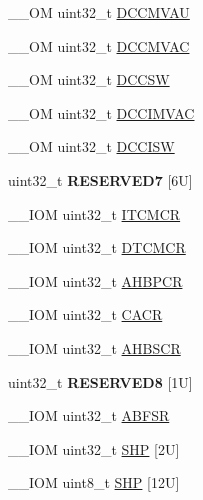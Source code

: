 \begin{DoxyCompactItemize}
\+\_\+\+\_\+\+OM uint32\+\_\+t \hyperlink{struct_s_c_b___type_aae3caeea159ab54859ea11397f942cfa}{D\+C\+C\+M\+V\+AU}
\item 
\+\_\+\+\_\+\+OM uint32\+\_\+t \hyperlink{struct_s_c_b___type_a042e3622c98de4e908cfda4f70d1f097}{D\+C\+C\+M\+V\+AC}
\item 
\+\_\+\+\_\+\+OM uint32\+\_\+t \hyperlink{struct_s_c_b___type_ab95cc818be9fa7d25ae516f3fe6b7788}{D\+C\+C\+SW}
\item 
\+\_\+\+\_\+\+OM uint32\+\_\+t \hyperlink{struct_s_c_b___type_a4f59813582b53feb5f1afbbad3db2022}{D\+C\+C\+I\+M\+V\+AC}
\item 
\+\_\+\+\_\+\+OM uint32\+\_\+t \hyperlink{struct_s_c_b___type_af50f7a0a9574fe0e24a68bb4eca75140}{D\+C\+C\+I\+SW}
\item 
\mbox{\label{struct_s_c_b___type_a5a892b5bc17fba63dad48a2352c26024}} 
uint32\+\_\+t {\bfseries R\+E\+S\+E\+R\+V\+E\+D7} \mbox{[}6\+U\mbox{]}
\item 
\+\_\+\+\_\+\+I\+OM uint32\+\_\+t \hyperlink{struct_s_c_b___type_aba8abbd3db06a07b50f56547501983f9}{I\+T\+C\+M\+CR}
\item 
\+\_\+\+\_\+\+I\+OM uint32\+\_\+t \hyperlink{struct_s_c_b___type_a2836e932734240076ce91cf4484cdf43}{D\+T\+C\+M\+CR}
\item 
\+\_\+\+\_\+\+I\+OM uint32\+\_\+t \hyperlink{struct_s_c_b___type_a0d53bcea294422b5b4ecfdcd9cdc1773}{A\+H\+B\+P\+CR}
\item 
\+\_\+\+\_\+\+I\+OM uint32\+\_\+t \hyperlink{struct_s_c_b___type_a51f9bd107a4e1d46ba647384e5c825b5}{C\+A\+CR}
\item 
\+\_\+\+\_\+\+I\+OM uint32\+\_\+t \hyperlink{struct_s_c_b___type_a8c9d9eac30594dd061d34cfaacd5e4bb}{A\+H\+B\+S\+CR}
\item 
\mbox{\label{struct_s_c_b___type_a59625ca4782dad641d92f0294c705985}} 
uint32\+\_\+t {\bfseries R\+E\+S\+E\+R\+V\+E\+D8} \mbox{[}1\+U\mbox{]}
\item 
\+\_\+\+\_\+\+I\+OM uint32\+\_\+t \hyperlink{struct_s_c_b___type_a35a95c9a21f43a569a7ac212acb4cee7}{A\+B\+F\+SR}
\item 
\+\_\+\+\_\+\+I\+OM uint32\+\_\+t \hyperlink{struct_s_c_b___type_a5c40d124f95a3f7f431a3d5409d6ad28}{S\+HP} \mbox{[}2\+U\mbox{]}
\item 
\+\_\+\+\_\+\+I\+OM uint8\+\_\+t \hyperlink{struct_s_c_b___type_a9b05f74580fc93daa7fe2f0e1c9c5663}{S\+HP} \mbox{[}12\+U\mbox{]}
\item 

\end{DoxyCompactItemize}
